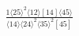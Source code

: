 \documentclass[varwidth, border=5pt]{standalone}
\begin{document}
\begin{my}
$\begin{gathered}
\scriptscriptstyle\frac{1⟨25⟩^2⟨12⟩[14]⟨45⟩}{⟨14⟩⟨24⟩^2⟨35⟩^2[45]}
\end{gathered}$
\end{my}
\end{document}
